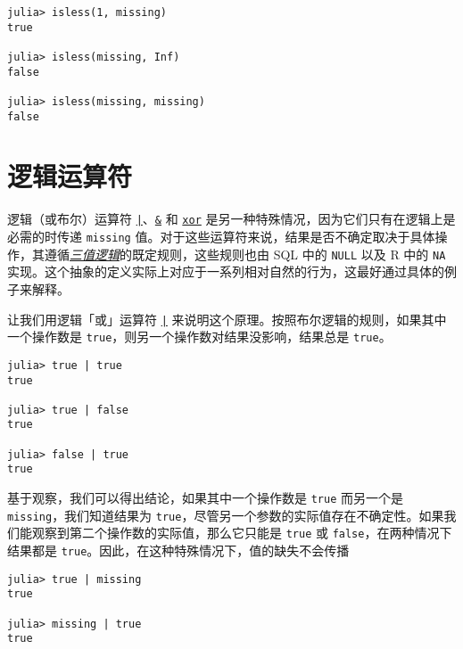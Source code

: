 \begin{verbatim}
julia> isless(1, missing)
true

julia> isless(missing, Inf)
false

julia> isless(missing, missing)
false
\end{verbatim}



\hypertarget{2677689633086417735}{}


\section{逻辑运算符}



逻辑（或布尔）运算符 \hyperlink{9633687763646488853}{\texttt{|}}、\hyperlink{1494761116451616317}{\texttt{\&}} 和 \hyperlink{7071880015536674935}{\texttt{xor}} 是另一种特殊情况，因为它们只有在逻辑上是必需的时传递 \texttt{missing} 值。对于这些运算符来说，结果是否不确定取决于具体操作，其遵循\href{https://en.wikipedia.org/wiki/Three-valued\_logic}{\emph{三值逻辑}}的既定规则，这些规则也由 SQL 中的 \texttt{NULL} 以及 R 中的 \texttt{NA} 实现。这个抽象的定义实际上对应于一系列相对自然的行为，这最好通过具体的例子来解释。



让我们用逻辑「或」运算符 \hyperlink{9633687763646488853}{\texttt{|}} 来说明这个原理。按照布尔逻辑的规则，如果其中一个操作数是 \texttt{true}，则另一个操作数对结果没影响，结果总是 \texttt{true}。




\begin{verbatim}
julia> true | true
true

julia> true | false
true

julia> false | true
true
\end{verbatim}



基于观察，我们可以得出结论，如果其中一个操作数是 \texttt{true} 而另一个是 \texttt{missing}，我们知道结果为 \texttt{true}，尽管另一个参数的实际值存在不确定性。如果我们能观察到第二个操作数的实际值，那么它只能是 \texttt{true} 或 \texttt{false}，在两种情况下结果都是 \texttt{true}。因此，在这种特殊情况下，值的缺失不会传播




\begin{verbatim}
julia> true | missing
true

julia> missing | true
true
\end{verbatim}




